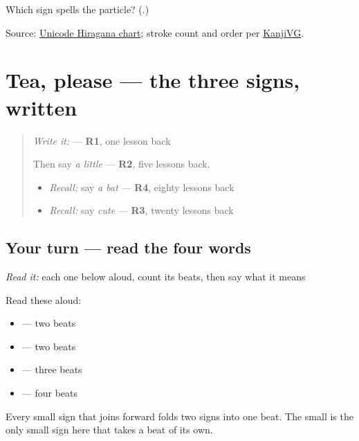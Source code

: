 \begin{tcolorbox}[breakable,colback=teal!4,colframe=teal!35!black,title={Before you move on}]
Which sign spells the particle? (\textbf{}.)

Source: \href{https://www.unicode.org/charts/PDF/U3040.pdf}{Unicode Hiragana chart}; stroke count and order per \href{https://kanjivg.tagaini.net/kanjivg/kanji/03092.html}{KanjiVG}.
\end{tcolorbox}
\section[(dialogue)]{Tea, please — the three signs, written}

\label{lesson:JA-R131-tea-please}



\begin{quote}
\emph{Write it:} \textbf{} — \textbf{R1}, one lesson back

Then say \emph{a little} — \textbf{R2}, five lessons back.

\begin{itemize}
\raggedright
  \item \emph{Recall:} say \emph{a bat} — \textbf{R4}, eighty lessons back
  \item \emph{Recall:} say \emph{cute} — \textbf{R3}, twenty lessons back
\end{itemize}
\end{quote}

\subsection*{Your turn — read the four words}
\emph{Read it:} each one below aloud, count its beats, then say what it means

Read these aloud:

\begin{itemize}
\raggedright
  \item \textbf{} — two beats
  \item \textbf{} — two beats
  \item \textbf{} — three beats
  \item \textbf{} — four beats
\end{itemize}

Every small sign that joins forward folds two signs into one beat. The small \textbf{} is the only small sign here that takes a beat of its own.

